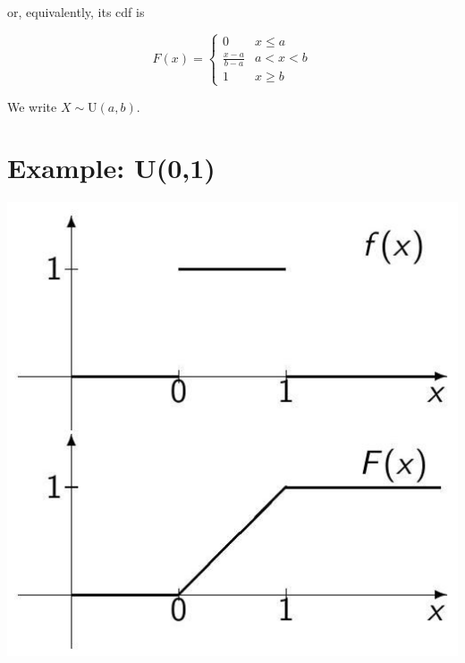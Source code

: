 \documentclass[10pt]{article}
\begin{document}
or, equivalently, its cdf is

$$
F(x)= \begin{cases}0 & x \leq a \\ \frac{x-a}{b-a} & a<x<b \\ 1 & x \geq b\end{cases}
$$

We write $X \sim \mathrm{U}(a, b)$.

\section*{Example: U(0,1)}
\begin{center}
\includegraphics[max width=\textwidth]{2025_05_11_1201cfe24e14b364b4ecg-19}
\end{center}
\end{document}
